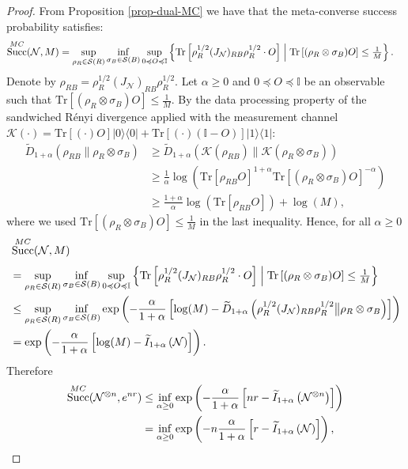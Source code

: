 \documentclass[a4paper,onecolumn,11pt,accepted=2025-10-01]{quantumarticle}
\DeclareMathOperator{\suc}{Succ}
\newcommand*{\dI}{\mathbb{I}}
\newcommand*{\cN}{\mathcal{N}}
\newcommand*{\cK}{\mathcal{K}}
\newcommand*{\cS}{\mathcal{S}}
\newcommand*{\tr}[1]{\mathrm{Tr}\left[#1\right]}
\newcommand*{\proj}[1]{|#1\rangle\!\langle #1|}
\newcommand*{\mle}{\preccurlyeq}
\begin{document}
\begin{proof}
    From Proposition \ref{prop-dual-MC} we have that the meta-converse  success probability satisfies: 
\begin{align}
   \suc_{}^{\rm{MC}}(\cN,M)  &= \sup_{{\rho}_{R} \in \cS(R)} \inf_{\sigma_B\in \cS(B)}\sup_{0\mle O\mle \dI} \left\{\tr{\rho_R^{1/2} ( J_{\cN})_{RB}\rho_R^{1/2} \cdot O} \; \middle| \; \tr{(\rho_R\otimes \sigma_B) O}\le \tfrac{1}{M} \right\}. 
\end{align}
Denote by $\rho_{RB} = \rho_R^{1/2} ( J_{\cN})_{RB}\rho_R^{1/2}$. Let $\alpha\ge 0$ and  $0\mle O\mle \dI $ be an observable such that $\tr{(\rho_R\otimes \sigma_B) O}\le \tfrac{1}{M}$. By the data processing property of the sandwiched R\'enyi divergence applied with the measurement channel $\cK(\cdot)= \tr{(\cdot)O}\proj{0}+ \tr{(\cdot)(\dI-O)}\proj{1}$:
\begin{align}
    \widetilde{D}_{1+\alpha}(\rho_{RB}\|\rho_R\otimes \sigma_B) &\ge \widetilde{D}_{1+\alpha}(\cK(\rho_{RB})\|\cK(\rho_R\otimes \sigma_B))
    \\&\ge \frac{1}{\alpha}\log\left( \tr{\rho_{RB}O}^{1+\alpha}\tr{(\rho_R\otimes \sigma_B) O}^{-\alpha} \right)
    \\&\ge \frac{1+\alpha}{\alpha}\log( \tr{\rho_{RB}O})+\log(M),\label{eq:sand}
\end{align}
where we used $\tr{(\rho_R\otimes \sigma_B) O}\le \tfrac{1}{M}$ in the last inequality. Hence, for all $\alpha\ge 0$
\begin{align}
   &\suc_{}^{\rm{MC}}(\cN,M)  \\&= \sup_{{\rho}_{R} \in \cS(R)} \inf_{\sigma_B\in \cS(B)}\sup_{0\mle O\mle \dI} \left\{\tr{\rho_R^{1/2} ( J_{\cN})_{RB}\rho_R^{1/2} \cdot O} \; \middle| \; \tr{(\rho_R\otimes \sigma_B) O}\le \tfrac{1}{M} \right\}
    \\ &\le  \sup_{{\rho}_{R} \in \cS(R)} \inf_{\sigma_B\in \cS(B)}  \exp\left(-\frac{\alpha}{1+\alpha} \left[ \log(M) - \widetilde{D}_{1+\alpha}\left(\rho_R^{1/2} ( J_{\cN})_{RB}\rho_R^{1/2}\big\|\rho_R\otimes \sigma_B\right) \right]\right)
       \\ &=   \exp\left(-\frac{\alpha}{1+\alpha} \left[ \log(M) - \widetilde{I}_{1+\alpha}\left(\cN\right) \right]\right).
\end{align}
Therefore 
\begin{align}
   \suc_{}^{\rm{MC}}(\cN^{\otimes n},e^{nr})  &\le   \inf_{\alpha\ge 0}  \exp\left(-\frac{\alpha}{1+\alpha} \left[ nr - \widetilde{I}_{1+\alpha}\left(\cN^{\otimes n}\right) \right]\right)
 \\&=   \inf_{\alpha\ge 0}   \exp\left(-n\frac{\alpha}{1+\alpha} \left[ r - \widetilde{I}_{1+\alpha}\left(\cN\right) \right]\right),

\end{align}
\end{proof}
\end{document}
